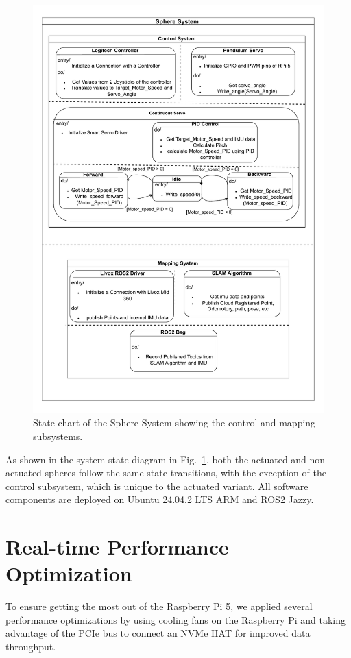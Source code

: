 \documentclass[english, bachelor, utf8]{base/thesis_telematics}
\begin{document}
\begin{figure}
    \centering
    \includegraphics[width=0.95\linewidth]{pics/Khonsu_vertical.pdf} 
    \caption{State chart of the Sphere System showing the control and mapping subsystems.}
    \label{fig:sphere_system}
\end{figure}

As shown in the system state diagram in Fig.~\ref{fig:sphere_system}, both the actuated and non-actuated spheres follow the same state transitions, with the exception of the control subsystem, which is unique to the actuated variant. 
All software components are deployed on Ubuntu 24.04.2 LTS ARM and ROS2 Jazzy.

\section{Real-time Performance Optimization}
To ensure getting the most out of the Raspberry Pi 5, we applied several performance optimizations by using cooling fans on the Raspberry Pi and taking advantage of the PCIe bus to connect an NVMe HAT for improved data throughput.
\end{document}
